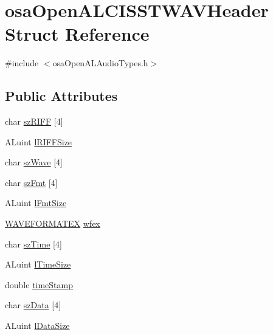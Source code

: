 \hypertarget{structosa_open_a_l_c_i_s_s_t_w_a_v_header}{\section{osa\-Open\-A\-L\-C\-I\-S\-S\-T\-W\-A\-V\-Header Struct Reference}
\label{structosa_open_a_l_c_i_s_s_t_w_a_v_header}
}


{\ttfamily \#include $<$osa\-Open\-A\-L\-Audio\-Types.\-h$>$}

\subsection*{Public Attributes}
\begin{DoxyCompactItemize}
\item 
char \hyperlink{structosa_open_a_l_c_i_s_s_t_w_a_v_header_ad204cfd59507548cd8a6c11b83afd9da}{sz\-R\-I\-F\-F} \mbox{[}4\mbox{]}
\item 
A\-Luint \hyperlink{structosa_open_a_l_c_i_s_s_t_w_a_v_header_ae3402f6fcd221cc033bf9e3914e1bcc1}{l\-R\-I\-F\-F\-Size}
\item 
char \hyperlink{structosa_open_a_l_c_i_s_s_t_w_a_v_header_a02f2c36a22eb4d9724059cca34cedb29}{sz\-Wave} \mbox{[}4\mbox{]}
\item 
char \hyperlink{structosa_open_a_l_c_i_s_s_t_w_a_v_header_a1b31e9471642dfe2423300c979d336d0}{sz\-Fmt} \mbox{[}4\mbox{]}
\item 
A\-Luint \hyperlink{structosa_open_a_l_c_i_s_s_t_w_a_v_header_a963147325b34f1313f74ef3475dc4b37}{l\-Fmt\-Size}
\item 
\hyperlink{struct_w_a_v_e_f_o_r_m_a_t_e_x}{W\-A\-V\-E\-F\-O\-R\-M\-A\-T\-E\-X} \hyperlink{structosa_open_a_l_c_i_s_s_t_w_a_v_header_a71f0f631b8d9cb27ef7aea0bc072e170}{wfex}
\item 
char \hyperlink{structosa_open_a_l_c_i_s_s_t_w_a_v_header_abf840e99890224e4da192546e1bf8211}{sz\-Time} \mbox{[}4\mbox{]}
\item 
A\-Luint \hyperlink{structosa_open_a_l_c_i_s_s_t_w_a_v_header_a24ad95377209bb52bd35f716a547daf5}{l\-Time\-Size}
\item 
double \hyperlink{structosa_open_a_l_c_i_s_s_t_w_a_v_header_a50e8ee3dcdfa333af1b637b6e4780924}{time\-Stamp}
\item 
char \hyperlink{structosa_open_a_l_c_i_s_s_t_w_a_v_header_a0a9c145994d6d293b1be775d33414a9e}{sz\-Data} \mbox{[}4\mbox{]}
\item 
A\-Luint \hyperlink{structosa_open_a_l_c_i_s_s_t_w_a_v_header_a9e8875efc234c0d10d3a0315aaddd253}{l\-Data\-Size}
\end{DoxyCompactItemize}


